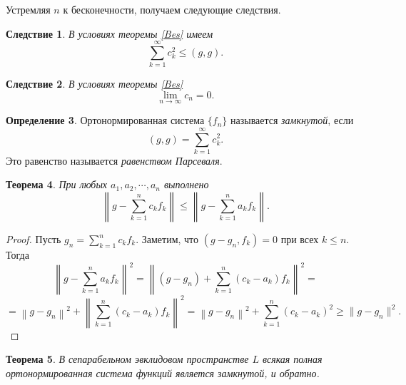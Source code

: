 \documentclass[12pt, titlepage, oneside]{amsbook}
\newtheorem{theorem}{Теорема}[chapter]
\newtheorem{corollary}[theorem]{Следствие}
\theoremstyle{definition}
\newtheorem{definition}[theorem]{Определение}
\theoremstyle{remark}
\begin{document}
Устремляя $n$ к бесконечности, получаем следующие следствия.

\begin{corollary}
\label{Bes2}
В условиях теоремы \ref{Bes} имеем $$\sum\limits_{k=1}^{\infty} c_k^2\leq(g,g).$$
\end{corollary}

\begin{corollary}
\label{Bes3}
В условиях теоремы \ref{Bes} $$\lim\limits_{n\rightarrow\infty} c_n=0.$$
\end{corollary}

 \begin{definition}
Ортонормированная система $\{f_n\}$ называется \emph{замкнутой}, если $$(g,g)=\sum\limits_{k=1}^{\infty} c_k^2.$$ Это равенство называется \emph{равенством Парсеваля}.
\end{definition}

 \begin{theorem}
 \label{Bes4}
При любых $a_1,a_2,\cdots, a_n$ выполнено $$\left\|g-\sum\limits_{k=1}^{n} c_k f_k\right\|\leq\left\|g-\sum\limits_{k=1}^{n} a_k f_k\right\|.$$
\end{theorem}

\begin{proof}
Пусть $g_n=\sum\limits_{k=1}^{n} c_k f_k$. Заметим, что $(g-g_n,f_k)=0$ при всех $k\leq n$. Тогда $$\left\|g-\sum\limits_{k=1}^{n} a_k f_k\right\|^2=\left\|(g-g_n)+\sum\limits_{k=1}^{n}(c_k-a_k) f_k\right\|^2=$$ $$=\left\|g-g_n\right\|^2+\left\|\sum\limits_{k=1}^{n}(c_k-a_k) f_k\right\|^2=\left\|g-g_n\right\|^2+\sum\limits_{k=1}^{n}(c_k-a_k)^2\geq\|g-g_n\|^2.$$
\end{proof}

 \begin{theorem}
 \label{Bes5}
В сепарабельном эвклидовом пространстве $L$ всякая полная ортонормированная система функций является замкнутой, и обратно.
\end{theorem}
\end{document}
